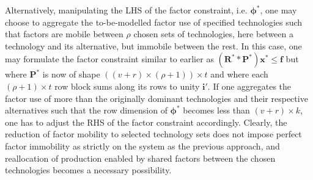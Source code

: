 \documentclass{article}
\begin{document}
\begin{refsection}
Alternatively, manipulating the LHS of the factor constraint, i.e. $\bm{\phi}^{*}$, one may choose to aggregate the to-be-modelled factor use of specified technologies such that factors are mobile between $\rho$ chosen sets of technologies, here between a technology and its alternative, but immobile between the rest. In this case, one may formulate the factor constraint similar to earlier as $(\bm{R}^{*} \ast \bm{P}^{*}) \bm{x}^{*} \le \bm{f}$ but where $\bm{P}^{*}$ is now of shape $((v + r) \times (\rho + 1)) \times t$ and where each $(\rho + 1) \times t$ row block sums along its rows to unity $\bm{i}'$. If one aggregates the factor use of more than the originally dominant technologies and their respective alternatives such that the row dimension of $\bm{\phi}^{*}$ becomes less than $(v + r) \times k$, one has to adjust the RHS of the factor constraint accordingly. Clearly, the reduction of factor mobility to selected technology sets does not impose perfect factor immobility as strictly on the system as the previous approach, and reallocation of production enabled by shared factors between the chosen technologies becomes a necessary possibility.


\end{refsection}
\end{document}
